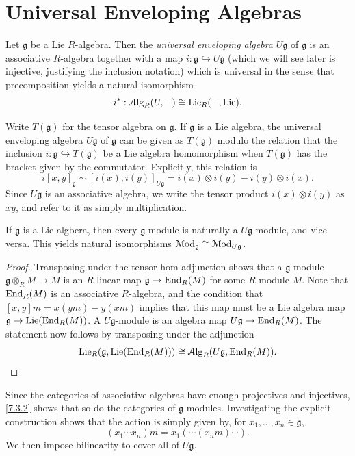 \section{Universal Enveloping Algebras}

\begin{definition}\label{7.3.1}
	Let $\mathfrak{g} $ be a Lie $R$-algebra. Then the \emph{universal enveloping algebra} $U\mathfrak{g} $ of $\mathfrak{g} $ is an associative $R$-algebra together with a map $i : \mathfrak{g} \hookrightarrow U\mathfrak{g} $ (which we will see later is injective, justifying the inclusion notation) which is universal in the sense that precomposition yields a natural isomorphism
	\[
		i^* : \mathcal{A}\mathrm{lg}_R(U,-)\cong \mathrm{Lie}_R(-,\mathrm{Lie})
	.\]
\end{definition}


Write $T(\mathfrak{g} )$ for the tensor algebra on $\mathfrak{g} $. If $\mathfrak{g} $ is a Lie algebra, the universal enveloping algebra $U\mathfrak{g} $ of $\mathfrak{g} $ can be given as $T(\mathfrak{g})$ modulo the relation that the inclusion $i : \mathfrak{g} \hookrightarrow T(\mathfrak{g} )$ be a Lie algebra homomorphism when $T(\mathfrak{g} )$ has the bracket given by the commutator. Explicitly, this relation is
\[
	i[x,y]_\mathfrak{g}  \sim  [i(x),i(y)]_{U\mathfrak{g} } =i(x)\otimes i(y) - i(y)\otimes i(x)
.\]
Since $U\mathfrak{g} $ is an associative algebra, we write the tensor product $i(x)\otimes i(y)$ as $xy$, and refer to it as simply multiplication.

\begin{proposition}\label{7.3.2}
	If $\mathfrak{g} $ is a Lie algbera, then every $\mathfrak{g} $-module is naturally a $U\mathfrak{g} $-module, and vice versa. This yields natural isomorphisms $\mathcal{M}\mathrm{od} _\mathfrak{g} \cong \mathcal{M}\mathrm{od} _{U\mathfrak{g} } $.
\end{proposition}
\begin{proof}
	Transposing under the tensor-hom adjunction shows that a $\mathfrak{g} $-module $\mathfrak{g} \otimes_RM\to M$ is an $R$-linear map $\mathfrak{g} \to \operatorname{End}_R(M)$ for some $R$-module $M$. Note that $\operatorname{End}_R(M) $ is an associative $R$-algebra, and the condition that $[x,y]m = x(ym) - y(xm)$ implies that this map must be a Lie algebra map $\mathfrak{g} \to \mathrm{Lie}(\operatorname{End}_{R}(M) )$. A $U\mathfrak{g} $-module is an algebra map $U\mathfrak{g} \to \operatorname{End}_R(M) $. The statement now follows by transposing under the adjunction
	\[
		\mathrm{Lie}_R(\mathfrak{g} ,\mathrm{Lie} (\operatorname{End}_{R} (M) ))\cong \mathcal{A}\mathrm{lg}_R(U\mathfrak{g} ,\operatorname{End}_R(M) )
	.\]
\end{proof}
Since the categories of associative algebras have enough projectives and injectives, \cref{7.3.2} shows that so do the categories of $\mathfrak{g} $-modules. Investigating the explicit construction shows that the action is simply given by, for $x_1, \ldots ,x_n\in \mathfrak{g} $,
\[
	(x_1 \cdots x_n)m = x_1(\cdots (x_nm)\cdots )
.\]
We then impose bilinearity to cover all of $U\mathfrak{g} $.

